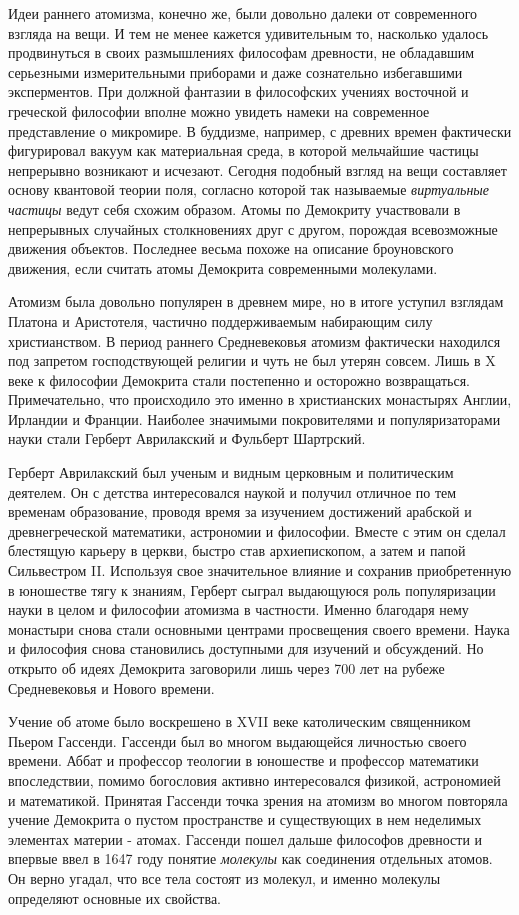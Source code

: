 Идеи раннего атомизма, конечно же, были довольно далеки от современного взгляда на вещи.
И тем не менее кажется удивительным то, насколько удалось продвинуться в своих размышлениях философам древности, не обладавшим серьезными измерительными приборами и даже сознательно избегавшими эксперментов.
При должной фантазии в философских учениях восточной и греческой философии вполне можно увидеть намеки на современное представление о микромире.
В буддизме, например, с древних времен фактически фигурировал вакуум как материальная среда, в которой мельчайшие частицы непрерывно возникают и исчезают. 
Сегодня подобный взгляд на вещи составляет основу квантовой теории поля, согласно которой так называемые \textit{виртуальные частицы} ведут себя схожим образом. 
Атомы по Демокриту участвовали в непрерывных случайных столкновениях друг с другом, порождая всевозможные движения объектов. 
Последнее весьма похоже на описание броуновского движения, если считать атомы Демокрита современными молекулами.

Атомизм была довольно популярен в древнем мире, но в итоге уступил взглядам Платона и Аристотеля, частично поддерживаемым набирающим силу христианством.
В период раннего Средневековья атомизм фактически находился под запретом господствующей религии и чуть не был утерян совсем.
Лишь в X веке к философии Демокрита стали постепенно и осторожно возвращаться.
Примечательно, что происходило это именно в христианских монастырях Англии, Ирландии и Франции.
Наиболее значимыми покровителями и популяризаторами науки стали Герберт Аврилакский и Фульберт Шартрский.

Герберт Аврилакский был ученым и видным церковным и политическим деятелем.
Он с детства интересовался наукой и получил отличное по тем временам образование, проводя время за изучением достижений арабской и древнегреческой математики, астрономии и философии.
Вместе с этим он сделал блестящую карьеру в церкви, быстро став архиепископом, а затем и папой Сильвестром II.
Используя свое значительное влияние и сохранив приобретенную в юношестве тягу к знаниям, Герберт сыграл выдающуюся роль популяризации науки в целом и философии атомизма в частности.
Именно благодаря нему монастыри снова стали основными центрами просвещения своего времени.
Наука и философия снова становились доступными для изучений и обсуждений.
Но открыто об идеях Демокрита заговорили лишь через 700 лет на рубеже Средневековья и Нового времени.

Учение об атоме было воскрешено в XVII веке католическим священником Пьером Гассенди. 
Гассенди был во многом выдающейся личностью своего времени. 
Аббат и профессор теологии в юношестве и профессор математики впоследствии, помимо богословия активно интересовался физикой, астрономией и математикой. 
Принятая Гассенди точка зрения на атомизм во многом повторяла учение Демокрита о пустом пространстве и существующих в нем неделимых элементах материи - атомах. 
Гассенди пошел дальше философов древности и впервые ввел в 1647 году понятие \textit{молекулы} как соединения отдельных атомов. 
Он верно угадал, что все тела состоят из молекул, и именно молекулы определяют основные их свойства. 

